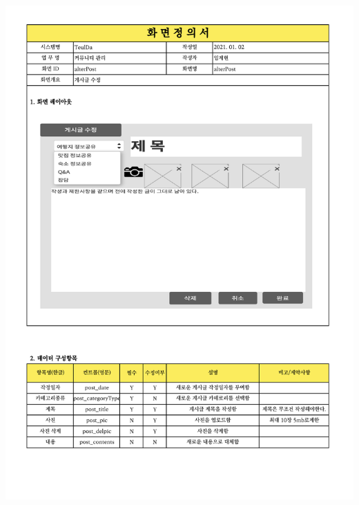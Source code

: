 {{{{{{{{{{{{{{{{{{{{{{{{{{{{{{{{{{{{{{{{{{{{{{{{{{{{{{{{\includegraphics[width=20cm]{./Figure/Analysis/Display/community/community_15.pdf} \\
}}}}}}}}}}}}}}}}}}}}}}}}}}}}}}}}}}}}}}}}}}}}}}}}}}}}}}}}
